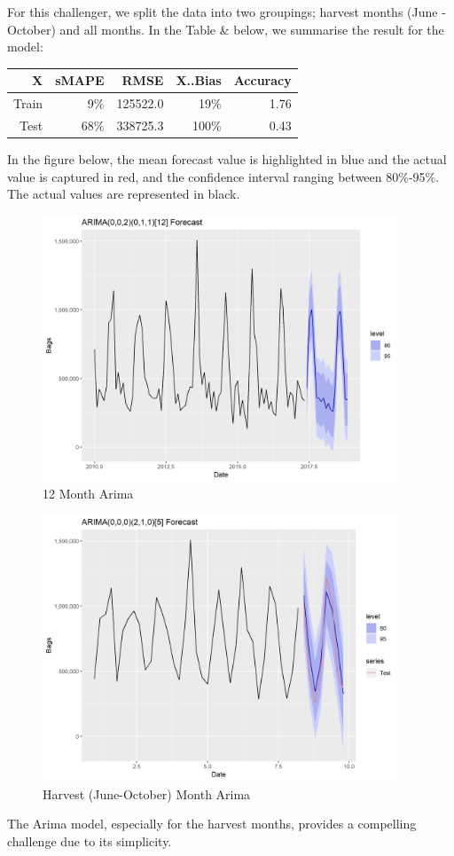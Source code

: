 \documentclass[12pt,oneside]{chicagocapstone}
\begin{document}
For this challenger, we split the data into two groupings; harvest
months (June - October) and all months. In the Table \& below, we
summarise the result for the model:
\begin{longtable}[]{@{}rrrrr@{}}
\toprule
X & sMAPE & RMSE & X..Bias & Accuracy\tabularnewline
\midrule
\endhead
Train & 9\% & 125522.0 & 19\% & 1.76\tabularnewline
Test & 68\% & 338725.3 & 100\% & 0.43\tabularnewline
\bottomrule
\end{longtable}
In the figure below, the mean forecast value is highlighted in blue and
the actual value is captured in red, and the confidence interval ranging
between 80\%-95\%. The actual values are represented in black.
\begin{figure}

{\centering \includegraphics[width=400px]{figure/Arima_12month} 

}

\caption{12 Month Arima}\label{fig:arima-12}
\end{figure}
\begin{figure}

{\centering \includegraphics[width=400px]{figure/HarvestArima} 

}

\caption{Harvest (June-October) Month Arima}\label{fig:arima-5}
\end{figure}
The Arima model, especially for the harvest months, provides a
compelling challenge due to its simplicity.
\end{document}
